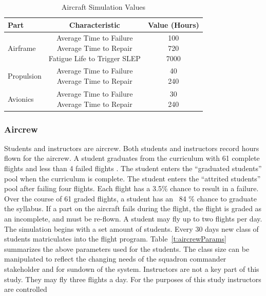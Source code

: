 \documentclass[preprint,12pt]{elsarticle}
\begin{document}
\begin{table}[h]
  \caption{Aircraft Simulation Values}
  \label{t:PartSettings}
  \begin{center}
  \begin{tabular}{l c c}
    \hline
    \hline
    \textbf{Part} & \textbf{Characteristic} & \textbf{Value (Hours)} \\
    \hline
    Airframe & \makecell{ Average Time to Failure \\ Average Time to
      Repair \\ Fatigue Life to Trigger SLEP}  &
    \makecell{ 100 \\ 720 \\ 7000} \\
    \hline
    Propulsion & \makecell{ Average Time to Failure \\ Average Time to
      Repair}  &
    \makecell{ 40 \\ 240 \\ } \\
    \hline
    Avionics & \makecell{ Average Time to Failure \\ Average Time to
      Repair}  &
    \makecell{ 30 \\ 240 \\ } \\
    \hline
  \end{tabular}
  \end{center}
\end{table}



\subsubsection{Aircrew}

Students and instructors are aircrew. Both
students and instructors record hours flown for the aircrew.  A
student graduates from the curriculum with 61 complete flights and
less than 4 failed 
flights \cite{Air2009}. The student enters the ``graduated students''
pool when the curriculum is complete. The student enters the
``attrited students'' pool after failing four flights. Each flight has
a 3.5\% chance to result in a failure. Over the course of 61 graded
flights, a student has an ~84 \% chance to graduate the syllabus. If a
part on the aircraft fails during the flight, the 
flight is graded as an incomplete, and must be re-flown. A student may
fly up to two flights per day. The simulation begins with a set
amount of students. Every 30 days new class of students
matriculates into the flight program. Table~\ref{t:aircrewParams}
summarizes the above parameters used for the students. The class size
can be manipulated to reflect the changing needs of the squadron
commander stakeholder and for sundown of the system. Instructors are
not a key part of this study. They may fly three flights a
day. For the purposes of this study instructors are controlled
\end{document}
